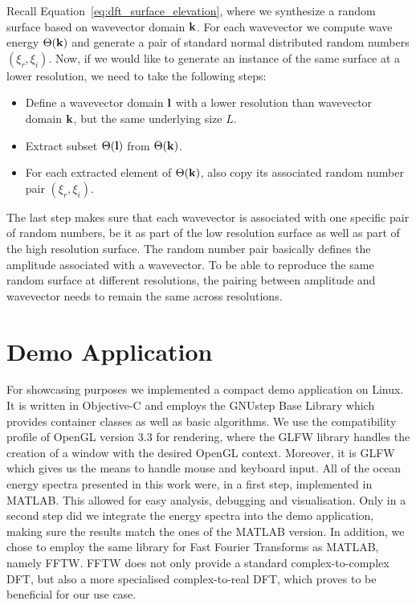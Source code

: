 Recall Equation~\ref{eq:dft_surface_elevation}, where we synthesize a random
surface based on wavevector domain $\mathbf{k}$. For each wavevector we compute
wave energy $\Theta(\mathbf{k})$ and generate a pair of standard normal
distributed random numbers $(\xi_r,\xi_i)$. Now, if we would like to generate
an instance of the same surface at a lower resolution, we need to take the
following steps:
\begin{itemize}
 \item Define a wavevector domain $\mathbf{l}$ with a lower resolution than
 wavevector domain $\mathbf{k}$, but the same underlying size $L$.
 \item Extract subset $\Theta(\mathbf{l})$ from $\Theta(\mathbf{k})$.
 \item For each extracted element of $\Theta(\mathbf{k})$, also copy its
 associated random number pair $(\xi_r,\xi_i)$.
\end{itemize}
The last step makes sure that each wavevector is associated with one specific
pair of random numbers, be it as part of the low resolution surface as well as
part of the high resolution surface. The random number pair basically defines
the amplitude associated with a wavevector. To be able to reproduce the same
random surface at different resolutions, the pairing between amplitude and
wavevector needs to remain the same across resolutions.

\section{Demo Application}
\label{sec:demo_application}
For showcasing purposes we implemented a compact demo application on Linux.
It is written in Objective-C and employs the GNUstep\cite{misc:gnustep}
Base Library which provides container classes as well as basic algorithms.
We use the compatibility profile of OpenGL\cite{misc:opengl} version 3.3
\cite{misc:opengl33} for rendering, where the GLFW library\cite{misc:glfw}
handles the creation of a window with the desired OpenGL context. Moreover,
it is GLFW which gives us the means to handle mouse and keyboard input.
All of the ocean energy spectra presented in this work were, in a first step,
implemented in MATLAB\cite{misc:matlab}. This allowed for easy analysis,
debugging and visualisation. Only in a second step did we integrate the energy
spectra into the demo application, making sure the results match the ones of
the MATLAB version. In addition, we chose to employ the same library for
Fast Fourier Transforms as MATLAB, namely FFTW\cite{misc:fftw}. FFTW does
not only provide a standard complex-to-complex DFT, but also a more specialised
complex-to-real DFT, which proves to be beneficial for our use case.

